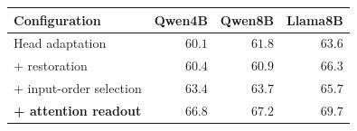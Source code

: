 \begingroup\renewcommand{\arraystretch}{1.08}
\begin{tabular}{@{}lrrr@{}}
\toprule
\textbf{Configuration} & \textbf{Qwen4B} & \textbf{Qwen8B} & \textbf{Llama8B} \\
\midrule
Head adaptation & $60.1$ & $61.8$ & $63.6$ \\
+ restoration & $60.4$ & $60.9$ & $66.3$ \\
+ input-order selection & $63.4$ & $63.7$ & $65.7$ \\
\rowcolor{tableours}\textbf{+ attention readout} & $\mathbf{66.8}$ & $\mathbf{67.2}$ & $\mathbf{69.7}$ \\
\bottomrule
\end{tabular}
\endgroup

